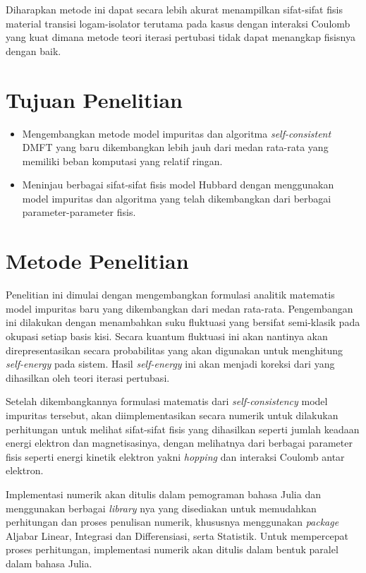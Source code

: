 Diharapkan metode ini dapat secara lebih akurat menampilkan sifat-sifat fisis material transisi logam-isolator terutama pada kasus dengan interaksi Coulomb yang kuat dimana metode teori iterasi pertubasi tidak dapat menangkap fisisnya dengan baik.


\section{Tujuan Penelitian}
\begin{itemize}
\item Mengembangkan metode model impuritas dan algoritma \textit{self-consistent} DMFT yang baru dikembangkan lebih jauh dari medan rata-rata yang memiliki beban komputasi yang relatif ringan.
\item Meninjau berbagai sifat-sifat fisis model Hubbard  dengan menggunakan model impuritas dan algoritma yang telah dikembangkan dari berbagai parameter-parameter fisis.
\end{itemize}

\section{Metode Penelitian}
Penelitian ini dimulai dengan mengembangkan formulasi analitik matematis model impuritas baru yang dikembangkan dari medan rata-rata. Pengembangan ini dilakukan dengan menambahkan suku fluktuasi yang bersifat semi-klasik pada okupasi setiap basis kisi. Secara kuantum fluktuasi ini akan nantinya akan direpresentasikan secara probabilitas yang akan digunakan untuk menghitung \textit{self-energy} pada sistem. Hasil \textit{self-energy} ini akan menjadi koreksi dari yang dihasilkan oleh teori iterasi pertubasi. 

Setelah dikembangkannya formulasi matematis dari \textit{self-consistency} model impuritas tersebut, akan diimplementasikan secara numerik untuk dilakukan perhitungan untuk melihat sifat-sifat fisis yang dihasilkan seperti jumlah keadaan energi elektron dan magnetisasinya, dengan melihatnya dari berbagai parameter fisis seperti energi kinetik elektron yakni \textit{hopping} dan interaksi Coulomb antar elektron.

Implementasi numerik akan ditulis dalam pemograman bahasa Julia dan menggunakan berbagai \textit{library} nya yang disediakan untuk memudahkan perhitungan dan proses penulisan numerik, khususnya menggunakan \textit{package} Aljabar Linear, Integrasi dan Differensiasi, serta Statistik. Untuk mempercepat proses perhitungan, implementasi numerik akan ditulis dalam bentuk paralel dalam bahasa Julia.

